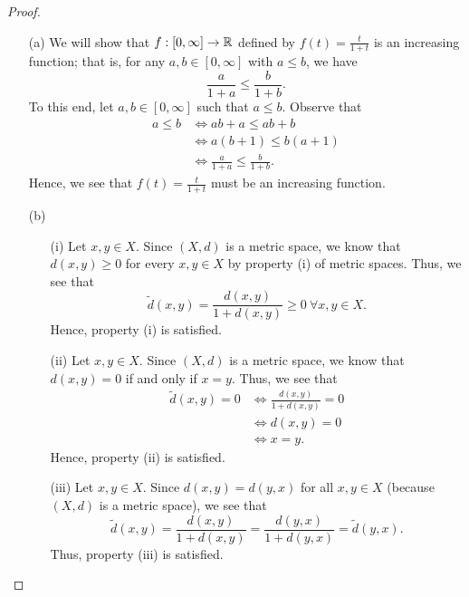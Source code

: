 \documentclass[a4paper]{article}
\begin{document}
\begin{proof}
\begin{enumerate}
    \item[(a)] We will show that \( f: [0,\infty ] \to \mathbb{R}  \) defined by \( f(t) = \frac{ t  }{  1 + t }  \) is an increasing function; that is, for any \( a,b \in [0,\infty ] \) with \( a \leq b  \), we have
        \[  \frac{  a  }{ 1 + a  }  \leq \frac{ b  }{ 1 + b }. \]
        To this end, let \( a,b \in [0,\infty ] \) such that \( a \leq b  \). Observe that
            \begin{align*}
                a \leq  b  &\Longleftrightarrow ab + a \leq ab +  b  \\
                        &\Longleftrightarrow a (b + 1) \leq b (a + 1) \\
                        &\Longleftrightarrow \frac{ a  }{ 1 + a  }  \leq \frac{ b }{  1 + b } .
            \end{align*}
            Hence, we see that \( f(t) = \frac{ t }{ 1+ t }  \) must be an increasing function.
        \item[(b)] 
            \begin{enumerate}
        \item[(i)] Let \( x,y \in X  \). Since \( (X,d) \) is a metric space, we know that          \( d(x,y) \geq 0  \) for every \( x,y \in X  \) by property (i) of metric spaces. Thus, we see that
            \[  \tilde{d}(x,y) = \frac{ d(x,y)  }{ 1 + d(x,y) } \geq 0 \ \forall x,y \in X. \]
            Hence, property (i) is satisfied.
        \item[(ii)] Let \( x,y \in X  \). Since \( (X,d) \) is a metric space, we know that \( d(x,y) = 0  \) if and only if \( x = y  \). Thus, we see that  
            \begin{align*}
                \tilde{d}(x,y) = 0 &\Longleftrightarrow \frac{ d(x,y) }{ 1 + d(x,y)  } = 0 \\
                           &\Longleftrightarrow d(x,y) = 0 \\
                           &\Longleftrightarrow x = y.
            \end{align*}
            Hence, property (ii) is satisfied.
        \item[(iii)] Let \( x,y \in X  \). Since \( d(x,y) = d(y,x) \) for all \( x,y \in X  \) (because \( (X,d) \) is a metric space), we see that  
            \[ \tilde{d}(x,y) = \frac{ d(x,y) }{ 1 + d(x,y) } = \frac{ d(y,x) }{ 1 + d(y,x) }  = \tilde{d}(y,x).  \]
            Thus, property (iii) is satisfied.

\end{enumerate}
\end{enumerate}
\end{proof}
\end{document}
